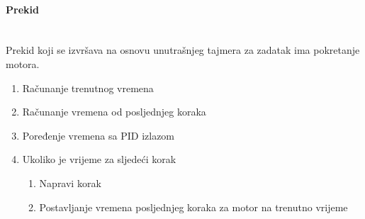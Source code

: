 \documentclass[../Document.tex]{subfiles}
\begin{document}
\paragraph{Prekid}\mbox{}\\
\noindent Prekid koji se izvršava na osnovu unutrašnjeg tajmera za zadatak ima pokretanje motora.

\begin{enumerate}
    \item Računanje trenutnog vremena
    \item Računanje vremena od posljednjeg koraka
    \item Poređenje vremena sa PID izlazom
    \item Ukoliko je vrijeme za sljedeći korak
          \begin{enumerate}
              \item Napravi korak
              \item Postavljanje vremena posljednjeg koraka za motor na trenutno vrijeme
          \end{enumerate}
\end{enumerate}
\end{document}
